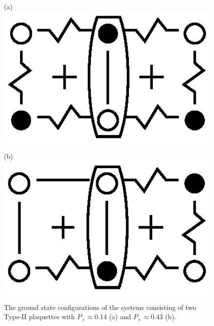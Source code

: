 \documentclass[preprint,12pt]{elsarticle}
\begin{document}
	\begin{figure}[H]
		\centering
		\begin{minipage}{0.2\textwidth}
			\centering
			(a)
			\includegraphics[width=1\textwidth]{pictures/Type2_3x2.eps}
			\label{fig:Type2_3x2}
		\end{minipage}
		\hspace{20pt}
		\begin{minipage}{0.2\textwidth}
			\centering
			(b)
			\includegraphics[width=1\textwidth]{pictures/Type2_3x2_2.eps}
			\label{fig:Type2_3x2_2}
		\end{minipage}
		\caption{The ground state configurations of the systems consisting of two Type-II plaquettes with $P_+\approx0.14$ (a) and $P_+\approx0.43$ (b).}
		\label{fig:Type2_32}
	\end{figure}
	
\end{document}
